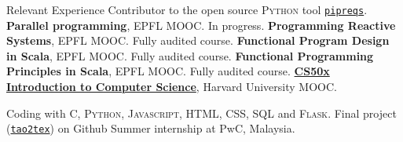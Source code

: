 \begin{rubric}{Relevant Experience}
\entry*[2023] Contributor to the open source \textsc{Python} tool \href{https://github.com/bndr/pipreqs}{\texttt{pipreqs}}.
\entry*[2023] \textbf{Parallel programming}, EPFL MOOC. In progress.
\entry*[2023] \textbf{Programming Reactive Systems}, EPFL MOOC. Fully audited course.
\entry*[2023] \textbf{Functional Program Design in Scala}, EPFL MOOC. Fully audited course.
\entry*[2022] \textbf{Functional Programming Principles in Scala}, EPFL MOOC. Fully audited course.
\entry*[2022] \href{https://certificates.cs50.io/61d7b5aa-582d-49e7-ada4-c7cd0b965c9b.pdf?size=letter}{\textbf{CS50x Introduction to Computer Science}}, Harvard University MOOC. \par Coding with \textsc{C, Python, Javascript, HTML, CSS, SQL} and \textsc{Flask}. Final project (\href{https://github.com/clvnkhr/tao2tex}{\texttt{tao2tex}}) on Github
\entry*[2015] Summer internship at PwC, Malaysia.
%


\end{rubric}

